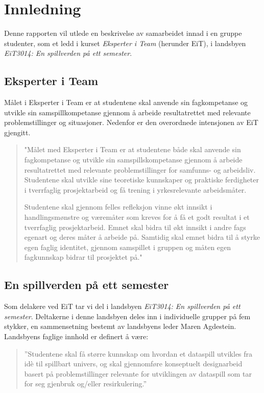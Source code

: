 \section{Innledning}
Denne rapporten vil utlede en beskrivelse av samarbeidet innad i en gruppe studenter, som et ledd i kurset \emph{Eksperter i Team} (herunder EiT), i landsbyen \emph{EiT3014: En spillverden på ett semester}.

\subsection{Eksperter i Team} Målet i Eksperter i Team er at studentene
skal anvende sin fagkompetanse og utvikle sin samspillkompetanse gjennom
å arbeide resultatrettet med relevante problemstillinger og situasjoner.
Nedenfor er den overordnede intensjonen av EiT gjengitt.

\begin{quotation}"Målet med Eksperter i Team er at studentene både skal anvende
sin fagkompetanse og utvikle sin samspillskompetanse gjennom å arbeide
resultatrettet med relevante problemstillinger for samfunns- og
arbeidsliv. Studentene skal utvikle sine teoretiske kunnskaper og
praktiske ferdigheter i tverrfaglig prosjektarbeid og få trening i
yrkesrelevante arbeidsmåter.

Studentene skal gjennom felles refleksjon vinne økt innsikt i
handlingsmønstre og væremåter som kreves for å få et godt resultat i et
tverrfaglig prosjektarbeid. Emnet skal bidra til økt innsikt i andre
fags egenart og deres måter å arbeide på. Samtidig skal emnet bidra til
å styrke egen faglig identitet, gjennom samspillet i gruppen og måten
egen fagkunnskap bidrar til prosjektet på."
\end{quotation}

\subsection{En spillverden på ett semester} Som delakere ved EiT tar vi
del i landsbyen \emph{EiT3014: En spillverden på ett semester}.
Deltakerne i denne landsbyen deles inn i individuelle grupper på fem
stykker, en sammensetning bestemt av landsbyens leder Maren Agdestein.
Landsbyens faglige innhold er definert å være: 

\begin{quotation}''Studentene skal få større kunnskap om hvordan et dataspill utvikles fra 
idè til spillbart univers, og skal gjennomføre konseptuelt designarbeid 
basert på problemstillinger relevante for utviklingen av dataspill som 
tar for seg gjenbruk og/eller resirkulering.''
\end{quotation}

